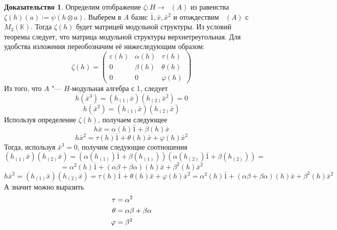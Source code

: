 \documentclass[a4paper, 12pt]{article}
\DeclareMathOperator{\End}{\mathrm{End}_{\mathbb{K}}}
\theoremstyle{definition}
\newtheorem*{prof}{\hspace*{\parindent}Доказательство}
\begin{document}
\begin{prof}
    Определим отображение $\zeta:H \to \End(A)$ из равенства $\zeta(h)(a) := \psi(h \otimes a)$.
    Выберем в $A$ базис $\bar 1, \bar x, \bar x^2$ и отождествим $\End(A)$ с $M_3(\mathbb{K})$. Тогда $\zeta(h)$ будет матрицей модульной структуры. Из условий теоремы следует, что матрица модульной структуры верхнетреугольная.
    Для удобства изложения переобозначим её нижеследующим образом: \[
    \zeta(h) = 
    \begin{pmatrix}
        \varepsilon(h) & \alpha(h) & \tau(h)\\
         0 & \beta(h) & \theta(h) \\
         0 & 0 & \varphi(h)
    \end{pmatrix}    
    \]
    Из того, что $A$ "--- $H$-модульная алгебра с 1, следует 
    $$h(\bar{x}^3)=(h_{(1)}\bar{x})(h_{(2)}\bar{x}^2) = 0 $$ 
    $$h(\bar{x}^2)=(h_{(1)}\bar{x})(h_{(2)}\bar{x})$$
    Используя определение $\zeta(h)$, получаем следующее
    $$h\bar x= \alpha(h)\bar1 + \beta(h) \bar x$$
    $$h\bar x^2 = \tau(h)\bar1 + \theta(h) \bar x + \varphi(h) \bar x^2$$
    Тогда, используя $\bar x^3 = 0$, получим следующие соотношения
    \[
    (h_{(1)}\bar{x})(h_{(2)}\bar{x}) = \left( \alpha(h_{(1)}) \bar{1} + \beta(h_{(1)}) \right)
    \left( \alpha(h_{(2)}) \bar{1} + \beta(h_{(2)}) \right)=
    \]
    \[
     = \alpha^2(h)\bar{1} + (\alpha\beta + \beta\alpha)(h) \bar{x} + \beta^2(h) \bar{x}^2
    \]
    $$h\bar x^2 = (h_{(1)}\bar{x})(h_{(2)}\bar{x}) = \tau(h)\bar1 + \theta(h) \bar x + \varphi(h) \bar x^2 = \alpha^2(h)\bar{1} + (\alpha\beta + \beta\alpha)(h) \bar{x} + \beta^2(h) \bar{x}^2$$
    А значит можно выразить  
    \begin{align} \label{repl}
        \tau &= \alpha^2 \notag \\
        \theta &= \alpha\beta+\beta\alpha \\
        \varphi &=\beta^2 \notag
    \end{align}


\end{prof}
\end{document}
